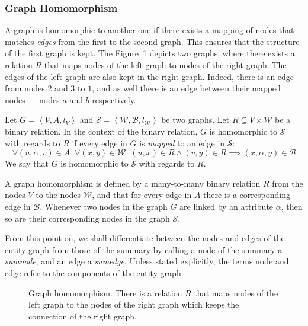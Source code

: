 \subsubsection{Graph Homomorphism}

A graph is homomorphic to another one if there exists a mapping of nodes that matches \emph{edges} from the first to the second graph. This ensures that the structure of the first graph is kept.
The Figure~\ref{fig:homomorphism} depicts two graphs, where there exists a relation $R$ that maps nodes of the left graph to nodes of the right graph. The edges of the left graph are also kept in the right graph. Indeed, there is an edge from nodes $2$ and $3$ to $1$, and as well there is an edge between their mapped nodes --- nodes $a$ and $b$ respectively.

\begin{definition}
Let $G=\left\langle V, A, l_V \right\rangle$ and $\mathcal{S}=\left\langle \mathcal{W}, \mathcal{B}, l_\mathcal{W} \right\rangle$ be two graphs. Let $R \subseteq V \times \mathcal{W}$ be a binary relation.
In the context of the binary relation, $G$ is homomorphic to $\mathcal{S}$ with regards to $R$ if every edge in $G$ is \emph{mapped} to an edge in $\mathcal{S}$:
$$
\forall (u, \alpha, v) \in A\;\; \forall (x, y) \in \mathcal{W}\;\; (u, x) \in R \wedge (v, y) \in R \implies (x, \alpha, y) \in \mathcal{B}
$$
We say that $G$ is homomorphic to $\mathcal{S}$ with regards to $R$.
\end{definition}

A graph homomorphism is defined by a many-to-many binary relation $R$ from the nodes $V$ to the nodes $\mathcal{W}$, and that for every edge in $A$ there is a corresponding edge in $\mathcal{B}$. Whenever two nodes in the graph $G$ are linked by an attribute $\alpha$, then so are their corresponding nodes in the graph $\mathcal{S}$.\\

\begin{remark}
From this point on, we shall differentiate between the nodes and edges of the entity graph from those of the summary by calling a node of the summary a \emph{sumnode}, and an edge a \emph{sumedge}. Unless stated explicitly, the terms node and edge refer to the components of the entity graph.
\end{remark}

\begin{figure}
	\centering
	
	\caption[Graph homomorphism]{Graph homomorphism. There is a relation $R$ that maps nodes of the left graph to the nodes of the right graph which keeps the connection of the right graph.}
	\label{fig:homomorphism}
\end{figure}

